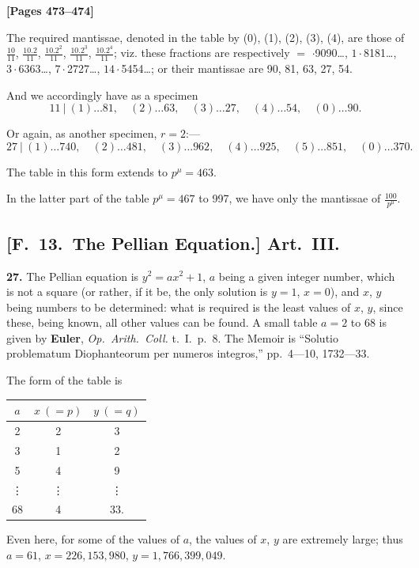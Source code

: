 \documentclass[11pt,a4paper]{book}
\begin{document}
\newpage
\textbf{[Pages 473--474]}

The required mantissae, denoted in the table by (0), (1), (2), (3), (4),
are those of $\frac{10}{11}$, $\frac{10.2}{11}$, $\frac{10.2^{2}}{11}$, $\frac{10.2^{3}}{11}$, $\frac{10.2^{4}}{11}$;
viz. these fractions are respectively $=$ $\cdot$9090\ldots, $1\cdot$8181\ldots, $3\cdot$6363\ldots,
$7\cdot$2727\ldots, $14\cdot$5454\ldots; or their mantissae are 90, 81, 63, 27, 54.

And we accordingly have as a specimen
\[11\ \big|\ (1)\ldots 81,\quad (2)\ldots 63,\quad (3)\ldots 27,\quad (4)\ldots 54,\quad (0)\ldots 90.\]

Or again, as another specimen, $r = 2$:---
\[27\ \big|\ (1)\ldots 740,\quad (2)\ldots 481,\quad (3)\ldots 962,\quad (4)\ldots 925,\quad (5)\ldots 851,\quad (0)\ldots 370.\]

The table in this form extends to $p^{\mu} = 463$.

In the latter part of the table $p^{\mu} = 467$ to 997, we have only the mantissae of $\frac{100}{p^{\mu}}$.

\subsection*{[F.\ 13.\ The Pellian Equation.] Art.\ III.}

\textbf{27.} The Pellian equation is $y^{2} = ax^{2} + 1$, $a$ being a given integer number, which is not a square
(or rather, if it be, the only solution is $y = 1$, $x = 0$), and $x$, $y$ being numbers to be determined:
what is required is the least values of $x$, $y$, since these, being known, all other values can be found.
A small table $a = 2$ to 68 is given by
\quad\textbf{Euler}, \textit{Op.\ Arith.\ Coll.} t.\ I.\ p.\ 8. The Memoir is ``Solutio problematum Diophanteorum per numeros integros,'' pp.\ 4---10, 1732---33.

The form of the table is
\begin{center}\begin{tabular}{c|cc}$a$ & $x\ (=p)$ & $y\ (=q)$ \\
\hline
2 & 2 & 3 \\
3 & 1 & 2 \\
5 & 4 & 9 \\
\vdots & \vdots & \vdots \\
68 & 4 & 33.\end{tabular}\end{center}

Even here, for some of the values of $a$, the values of $x$, $y$ are extremely large;
thus $a = 61$, $x = 226{,}153{,}980$, $y = 1{,}766{,}399{,}049$.
\end{document}
